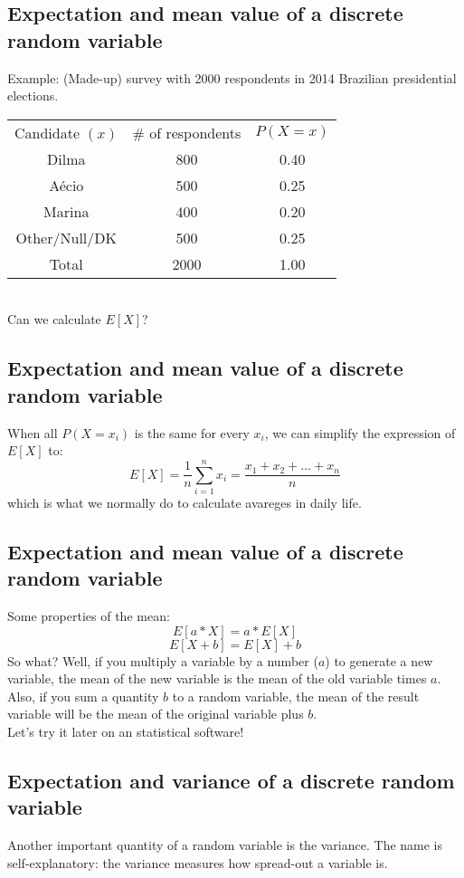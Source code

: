 \documentclass[11pt]{article}
\begin{document}
	\subsection*{Expectation and mean value of a discrete random variable}
	Example: (Made-up) survey with 2000 respondents in 2014 Brazilian presidential elections.
	\newline\\
		\begin{tabular}{|c|c|c|}
\hline
	Candidate $(x)$ & \# of respondents & $P(X=x)$\\
	\cline{1-3}
	Dilma & 800  & 0.40\\
	Aécio &  500 & 0.25\\
	Marina & 400 & 0.20\\
	Other/Null/DK & 500 & 0.25 \\
	\cline{1-3}
	Total & 2000 & 1.00\\
\hline
\end{tabular}
	\newline\\
	Can we calculate $E[X]$?


	\subsection*{Expectation and mean value of a discrete random variable}
	When all $P(X=x_i)$ is the same for every $x_i$, we can simplify the expression of $E[X]$ to:
	\[E[X] = \frac{1}{n}\sum\limits_{i=1}^n x_i = \frac{x_1 + x_2 + ... + x_n}{n}\]
	which is what we normally do to calculate avareges in daily life.

	\subsection*{Expectation and mean value of a discrete random variable}
	Some properties of the mean:
	\[E[a*X] = a * E[X]\]
	\[E[X+ b] = E[X] + b\]
	So what? Well, if you multiply a variable by a number ($a$) to generate a new variable, the mean of the new variable is the mean of the old variable times $a$.
	\newline\\Also, if you sum a quantity $b$ to a random variable, the mean of the result variable will be the mean of the original variable plus $b$.
	\newline\\Let's try it later on an statistical software!

	\subsection*{Expectation and variance of a discrete random variable}
	Another important quantity of a random variable is the variance. The name is self-explanatory: the variance measures how spread-out a variable is.
\end{document}
